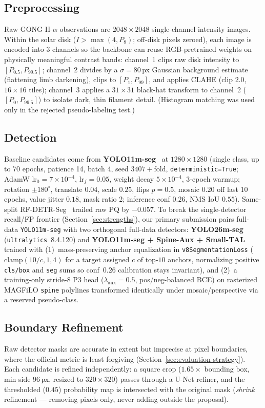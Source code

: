 \documentclass[sigconf]{acmart}
\begin{document}
\subsection{Preprocessing}
    Raw GONG H-$\alpha$ observations are $2048\times2048$ single-channel intensity images. Within the solar disk ($I>\max(4,P_8)$; off-disk pixels zeroed), each image is encoded into 3 channels so the backbone can reuse RGB-pretrained weights on physically meaningful contrast bands: channel~1 clips raw disk intensity to $[P_{0.5},P_{99.5}]$; channel~2 divides by a $\sigma{=}80$\,px Gaussian background estimate (flattening limb darkening), clips to $[P_1,P_{99}]$, and applies CLAHE (clip $2.0$, $16{\times}16$ tiles); channel~3 applies a $31{\times}31$ black-hat transform to channel~2 ($[P_0,P_{99.5}]$) to isolate dark, thin filament detail. (Histogram matching was used only in the rejected pseudo-labeling test.)

\subsection{Detection}
    Baseline candidates come from \textbf{YOLO11m-seg}~\cite{yolo11} at $1280{\times}1280$ (single class, up to 70 epochs, patience 14, batch 4, seed $3407{+}\text{fold}$, \texttt{deterministic=True}; AdamW $\text{lr}_0{=}7{\times}10^{-4}$, $\text{lr}_f{=}0.05$, weight decay $5{\times}10^{-4}$, 3-epoch warmup; rotation $\pm180^\circ$, translate $0.04$, scale $0.25$, flips $p{=}0.5$, mosaic $0.20$ off last 10 epochs, value jitter $0.18$, mask ratio 2; inference conf $0.26$, NMS IoU $0.55$). Same-split RF-DETR-Seg~\cite{rfdetr2025} trailed raw PQ by $-0.057$. To break the single-detector recall/FP frontier (Section~\ref{sec:strengths}), our primary submission pairs full-data \texttt{YOLO11m-seg} with two orthogonal full-data detectors: \textbf{YOLO26m-seg}~\cite{yolo11} (\texttt{ultralytics}~8.4.120) and \textbf{YOLO11m-seg + Spine-Aux + Small-TAL} trained with (1)~mass-preserving anchor equalization in \texttt{v8SegmentationLoss} ($\mathrm{clamp}(10/c,1,4)$ for a target assigned $c$ of top-$10$ anchors, normalizing positive \texttt{cls/box} and \texttt{seg} sums so conf~$0.26$ calibration stays invariant), and (2)~a training-only stride-8 P3 head ($\lambda_{\text{aux}}{=}0.5$, pos/neg-balanced BCE) on rasterized MAGFiLO \texttt{spine} polylines transformed identically under mosaic/perspective via a reserved pseudo-class.

\subsection{Boundary Refinement}\label{sec:refiner}
    Raw detector masks are accurate in extent but imprecise at pixel boundaries, where the official metric is least forgiving (Section~\ref{sec:evaluation-strategy}). Each candidate is refined independently: a square crop ($1.65\times$ bounding box, min side 96\,px, resized to $320{\times}320$) passes through a U-Net refiner, and the thresholded ($0.45$) probability map is intersected with the original mask (\emph{shrink} refinement --- removing pixels only, never adding outside the proposal).
\end{document}
